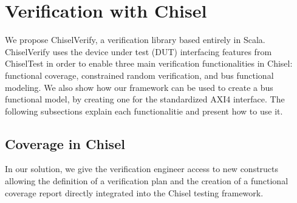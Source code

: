 \documentclass[conference]{IEEEtran}
\begin{document}
\section{Verification with Chisel}

We propose ChiselVerify, a verification library based entirely in Scala. ChiselVerify uses the device under test (DUT) interfacing features from ChiselTest in order to enable three main verification functionalities in Chisel: functional coverage, constrained random verification, and bus functional modeling. We also show how our framework can be used to create a bus functional model, by creating one for the standardized AXI4 interface. The following subsections explain each functionalitie and present how to use it.

\subsection{Coverage in Chisel}


In our solution, we give the verification engineer access to new constructs allowing the definition of a verification plan and the creation of a functional coverage report directly integrated into the Chisel testing framework.
\end{document}
